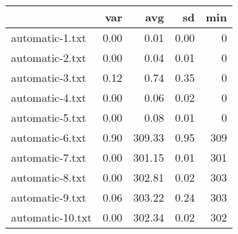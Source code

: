 \begin{tabular}{lrrrr}
  \toprule  & var & avg & sd & min \\ 
  \midrule automatic-1.txt & 0.00 & 0.01 & 0.00 & 0 \\ 
  automatic-2.txt & 0.00 & 0.04 & 0.01 & 0 \\ 
  automatic-3.txt & 0.12 & 0.74 & 0.35 & 0 \\ 
  automatic-4.txt & 0.00 & 0.06 & 0.02 & 0 \\ 
  automatic-5.txt & 0.00 & 0.08 & 0.01 & 0 \\ 
  automatic-6.txt & 0.90 & 309.33 & 0.95 & 309 \\ 
  automatic-7.txt & 0.00 & 301.15 & 0.01 & 301 \\ 
  automatic-8.txt & 0.00 & 302.81 & 0.02 & 303 \\ 
  automatic-9.txt & 0.06 & 303.22 & 0.24 & 303 \\ 
  automatic-10.txt & 0.00 & 302.34 & 0.02 & 302 \\ 
   \bottomrule \end{tabular}

